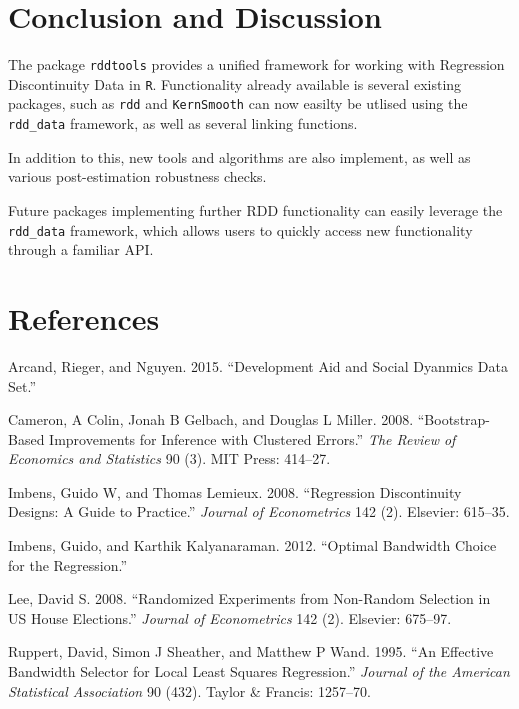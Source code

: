 \documentclass[article]{jss}
\begin{document}
\section{Conclusion and Discussion}\label{conclusion-and-discussion}

The package \texttt{rddtools} provides a unified framework for working
with Regression Discontinuity Data in \texttt{R}. Functionality already
available is several existing packages, such as \texttt{rdd} and
\texttt{KernSmooth} can now easilty be utlised using the
\texttt{rdd\_data} framework, as well as several linking functions.

In addition to this, new tools and algorithms are also implement, as
well as various post-estimation robustness checks.

Future packages implementing further RDD functionality can easily
leverage the \texttt{rdd\_data} framework, which allows users to quickly
access new functionality through a familiar API.

\section*{References}\label{references}

Arcand, Rieger, and Nguyen. 2015. ``Development Aid and Social Dyanmics
Data Set.''

Cameron, A Colin, Jonah B Gelbach, and Douglas L Miller. 2008.
``Bootstrap-Based Improvements for Inference with Clustered Errors.''
\emph{The Review of Economics and Statistics} 90 (3). MIT Press:
414--27.

Imbens, Guido W, and Thomas Lemieux. 2008. ``Regression Discontinuity
Designs: A Guide to Practice.'' \emph{Journal of Econometrics} 142 (2).
Elsevier: 615--35.

Imbens, Guido, and Karthik Kalyanaraman. 2012. ``Optimal Bandwidth
Choice for the Regression.''

Lee, David S. 2008. ``Randomized Experiments from Non-Random Selection
in US House Elections.'' \emph{Journal of Econometrics} 142 (2).
Elsevier: 675--97.

Ruppert, David, Simon J Sheather, and Matthew P Wand. 1995. ``An
Effective Bandwidth Selector for Local Least Squares Regression.''
\emph{Journal of the American Statistical Association} 90 (432). Taylor
\& Francis: 1257--70.
\end{document}
